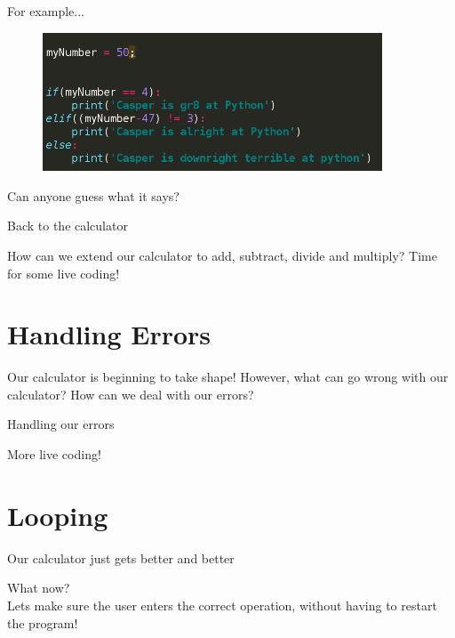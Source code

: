\documentclass{beamer}
\begin{document}
\begin{frame}{For example...}

\begin{figure}[h]
\includegraphics[width=0.9\textwidth]{exampleif}
\end{figure}

\pause

Can anyone guess what it says?

\end{frame}



\begin{frame}{Back to the calculator}

How can we extend our calculator to add, subtract, divide and multiply?
\pause
Time for some live coding!

\end{frame}

\section{Handling Errors}

\begin{frame}
Our calculator is beginning to take shape!
\pause
However, what can go wrong with our calculator?
\pause
How can we deal with our errors?

\end{frame}

\begin{frame}{Handling our errors}

More live coding!

\end{frame}

\section{Looping}

\begin{frame}{Our calculator just gets better and better}

What now?\\
\pause
Lets make sure the user enters the correct operation, without having to restart the program!

\end{frame}
\end{document}
